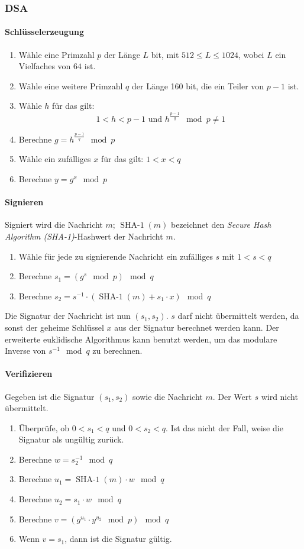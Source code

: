 \documentclass[8pt,a4paper,landscape]{article}
\begin{document}
\begin{multicols}{4}
\subsubsection{DSA}
\paragraph{Schlüsselerzeugung}
\begin{enumerate}[itemsep=1pt] 
\item Wähle eine Primzahl $p$ der Länge $L$ bit, mit $512\leq L\leq 1024$, wobei $L$ ein Vielfaches von $64$ ist.
\item Wähle eine weitere Primzahl $q$ der Länge 160 bit, die ein Teiler von $p-1$ ist.
\item Wähle $h$ für das gilt: \[1<h<p-1 \text{ und } h^{\frac{p-1}{q}}\mod p\neq 1\]
\item Berechne $g=h^{\frac{p-1}{q}}\mod p$
\item Wähle ein zufälliges $x$ für das gilt: $1<x<q$
\item Berechne $y=g^{x}\mod p$
\end{enumerate}

\paragraph{Signieren}
Signiert wird die Nachricht $m$; $\operatorname{SHA-1}(m)$ bezeichnet den \textit{Secure Hash Algorithm (SHA-1)}-Hashwert der Nachricht $m$. \begin{enumerate}
\item Wähle für jede zu signierende Nachricht ein zufälliges $s$ mit $1<s<q$
\item Berechne $s_{1}=(g^{s}\mod p)\mod q$
\item Berechne $s_{2}=s^{-1}\cdot (\operatorname{SHA-1}(m)+s_{1}\cdot x)\mod q$\end{enumerate}
Die Signatur der Nachricht ist nun $(s_{1},s_{2})$. $s$ darf nicht übermittelt werden, da sonst der geheime Schlüssel $x$ aus der Signatur berechnet werden kann.
Der erweiterte euklidische Algorithmus kann benutzt werden, um das modulare Inverse von $s^{-1}\mod q$ zu berechnen.

\paragraph{Verifizieren} Gegeben ist die Signatur $(s_{1}, s_{2})$ sowie die Nachricht $m$. Der Wert $s$ wird nicht übermittelt.\begin{enumerate}[itemsep=1pt] 
\item Überprüfe, ob $0 < s_1 < q$ und $0 < s_2 < q$. Ist das nicht der Fall, weise die Signatur als ungültig zurück.
\item Berechne $w=s_{2}^{-1}\mod q$
\item Berechne $u_{1}=\operatorname{SHA-1}(m)\cdot w\mod q$
\item Berechne $u_{2}=s_{1}\cdot w\mod q$
\item Berechne $v=(g^{u_1}\cdot y^{u_2}\mod p)\mod q$
\item Wenn $v=s_{1}$, dann ist die Signatur gültig.\end{enumerate}


\end{multicols}
\end{document}
